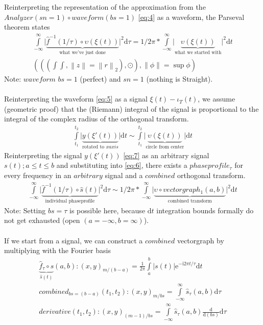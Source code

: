 \documentclass{report}
\newcommand\norm[1]{\left\lVert#1\right\rVert}
\begin{document}
Reinterpreting the representation of the approximation from the $Analyzer(sn=1) \circ waveform(bs=1)$ \eqref{eq:4} as a waveform, the Parseval theorem states
\begin{align}
\int\limits_{-\infty}^{\infty} \lvert \underbrace{\hat{f}^{-1}(1/\tau)\circ \upsilon(\xi (t))}_{\text{what we've just done}}\rvert ^2 \mathrm{d}\tau = 1/2\pi * \int\limits_{-\infty}^{\infty} \lvert \underbrace{\upsilon (\xi (t))}_{\text{what we started with}} \rvert ^2 \mathrm{d}t\label{eq:6}\\
(((\int \int,\norm{z}=\norm{r}_2),\odot),\norm{\phi}= \sup \phi)
\end{align}
Note: $waveform$ $bs=1$ (perfect) and $sn=1$ (nothing is Straight).\\\\
Reinterpreting the waveform \eqref{eq:5} as a signal $\xi (t) - \iota_{T}(t)$, we assume (geometric proof) that the (Riemann) integral of the signal is proportional to the integral of the complex radius of the orthogonal transform.
\begin{align}
\int\limits_{t_{1}}^{t_{2}} \lvert \underbrace{y(\xi '(t))}_{\text{rotated to }xaxis}\rvert \mathrm{d} t \sim \int\limits_{t_{1}}^{t_{2}} \lvert \underbrace{\upsilon (\xi (t))}_{\text{circle from center}} \rvert \mathrm{d}t\label{eq:7}
\end{align}
Reinterpreting the signal $y(\xi '(t))$ \eqref{eq:7} as an arbitrary signal $s(t);a \leq t \leq b$ and substituting into \eqref{eq:6}, there exists a $phaseprofile_{\tau}$ for every frequency in an $arbitrary$ signal and a $combined$ orthogonal transform.
\begin{align}
\int\limits_{-\infty}^{\infty} \lvert \underbrace{\hat{f}^{-1}(1/\tau)\circ \hat{s}(t)}_{\text{individual phaseprofile}}\rvert ^2 \mathrm{d}\tau \sim 1/2\pi * \int\limits_{-\infty}^{\infty} \lvert \underbrace{\upsilon \circ vectorgraph_{1}(a,b)}_{\text{combined transform}} \rvert ^2 \mathrm{d}t
\end{align}
Note: Setting $bs=\tau$ is possible here, because $\mathrm{d}t$ integration bounds formally do not get exhausted (open $(a=-\infty,b=\infty)$).\\\\
If we start from a signal, we can construct a $combined$ vectorgraph by multiplying with the Fourier basis
\begin{align}
\underbrace{ \hat{f}_{\tau}\circ s}_{\hat{s}(t)}(a,b): (x,y)_{m/(b-a)} = \frac{1}{2\pi} \int\limits_{a}^{b} \lvert s(t)\rvert \mathrm{e}^{-\mathrm{i}2\pi t/\tau} \mathrm{d}t\\
combined_{bs=(b-a)}(t_{1},t_{2}): (x,y)_{m/bs} = \int \limits_{-\infty}^{\infty} \hat{s}_{\tau}(a,b) \mathrm{d}\tau\\
derivative(t_{1},t_{2}): (x,y)_{(m-1)/bs} = \int \limits_{-\infty}^{\infty} \hat{s}_{\tau}(a,b) \frac{\mathrm{d}}{\mathrm{d}(bs)} \mathrm{d}\tau
\end{align}
\end{document}
